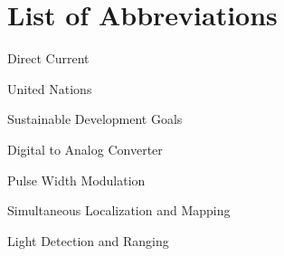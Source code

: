 \linespread{1.0}
\setlength{\parskip}{0.1em}
\section*{List of Abbreviations}

\begin{acronym}
  {Direct Current}
\end{acronym}
\begin{acronym}
  {United Nations}
\end{acronym}
\begin{acronym}
  {Sustainable Development Goals}
\end{acronym}
\begin{acronym}
  {Digital to Analog Converter}
\end{acronym}
\begin{acronym}
  {Pulse Width Modulation}
\end{acronym}
\begin{acronym}
  {Simultaneous Localization and Mapping}
\end{acronym}
\begin{acronym}
  {Light Detection and Ranging}
\end{acronym}
